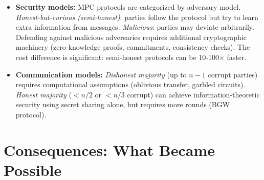 \begin{itemize}
\item \textbf{Security models:} MPC protocols are categorized by adversary model. \emph{Honest-but-curious (semi-honest)}: parties follow the protocol but try to learn extra information from messages. \emph{Malicious}: parties may deviate arbitrarily. Defending against malicious adversaries requires additional cryptographic machinery (zero-knowledge proofs, commitments, consistency checks). The cost difference is significant: semi-honest protocols can be 10-100$\times$ faster.

\item \textbf{Communication models:} \emph{Dishonest majority} (up to $n-1$ corrupt parties) requires computational assumptions (oblivious transfer, garbled circuits). \emph{Honest majority} ($< n/2$ or $< n/3$ corrupt) can achieve information-theoretic security using secret sharing alone, but requires more rounds (BGW protocol).
\end{itemize}

\section{Consequences: What Became Possible}
\label{sec:crypto:consequences}

